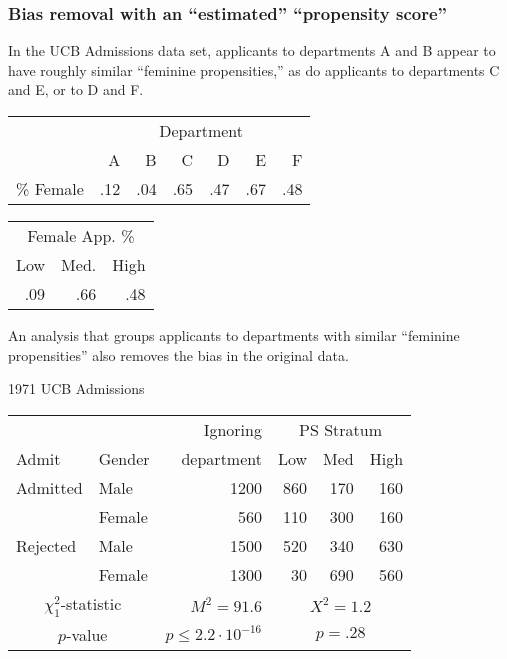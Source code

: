 \begin{frame}[label=FemPptyFr]
\frametitle{Bias removal with an ``estimated'' ``propensity
score''}

In the UCB Admissions data set, applicants to departments A and B
appear to have roughly similar ``feminine propensities,'' as do
applicants to departments C and E, or to D and F.

{
 \begin{tabular}[b]{|l|rrrrrr|} \hline
& \multicolumn{6}{|c|}{Department} \\
&   A &   B &   C &   D &   E &   F \\ \hline
\% Female & .12 & .04 & .65 & .47 & .67 & .48 \\ \hline
\end{tabular}
 \pause
 \begin{tabular}[b]{rrr|} \hline
  \multicolumn{3}{c|}{Female App. \%}\\
  Low & Med. & High \\ \hline
  .09 & .66 & .48 \\ \hline
\end{tabular}
}

  An analysis that groups applicants to departments with similar
``feminine propensities'' also removes the bias in the original
data.
{\small
\begin{center}
1971 UCB Admissions \citep{Bickel:etal:1975}
\begin{tabular}{|ll|r|rrr|} \hline
         &       & Ignoring & \multicolumn{3}{|c|}{PS Stratum} \\
Admit    &Gender &department&Low& Med & High \\ \hline
Admitted &Male   & 1200    &860 & 170 & 160 \\
         &Female &  560    &110 & 300 & 160 \\
Rejected &Male   & 1500    &520 & 340 & 630 \\
         &Female & 1300    & 30 & 690 & 560 \\ \hline
\multicolumn{2}{|c|}{$\chi_1^2$-statistic} & $M^2=91.6$ &\multicolumn{3}{|c|}{$X^2=1.2$} \\
\multicolumn{2}{|c|}{$p$-value } & $p \leq 2.2\cdot 10^{-16}$
&\multicolumn{3}{|c|}{$p=.28$} \\ \hline
\end{tabular}
\end{center}
}
\end{frame}


